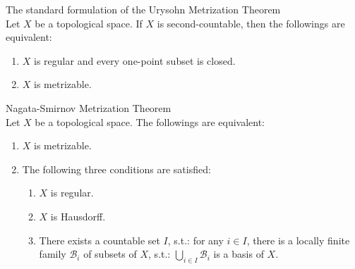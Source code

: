 \begin{theorem}{The standard formulation of the Urysohn Metrization Theorem}\\
Let $X$ be a topological space. If $X$ is second-countable, then the followings are equivalent:
\begin{enumerate}
    \item $X$ is regular and every one-point subset is closed.
    \item $X$ is metrizable.
\end{enumerate}
\end{theorem}

\begin{theorem}{Nagata-Smirnov Metrization Theorem}\\
Let $X$ be a topological space. The followings are equivalent:
\begin{enumerate}
    \item $X$ is metrizable.
    \item The following three conditions are satisfied:
    \begin{enumerate}
        \item $X$ is regular.
        \item $X$ is Hausdorff.
        \item There exists a countable set $I$, s.t.: for any $i \in I$, there is a locally finite family $\mathcal{B}_i$ of subsets of $X$, s.t.: $\bigcup_{i \in I} \mathcal{B}_i$ is a basis of $X$.
    \end{enumerate}
\end{enumerate}
\end{theorem}